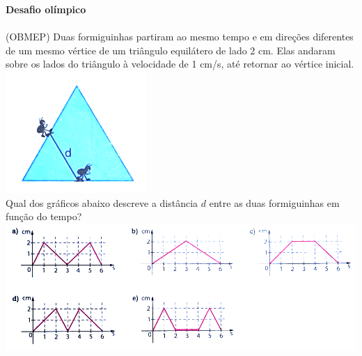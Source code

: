 \documentclass[a4paper,14pt]{article}
\begin{document}
    	    \noindent\textbf{Desafio olímpico}\\\\
    	    (OBMEP) Duas formiguinhas partiram ao mesmo tempo e em direções diferentes de um mesmo vértice de um triângulo equilátero de lado 2 cm. Elas andaram sobre os lados do triângulo à velocidade de 1 cm/s, até retornar ao vértice inicial. \\
    	    \includegraphics[width=0.3\linewidth]{imagens_8FMA74/imagem2}\\
    	    Qual dos gráficos abaixo descreve a distância $d$ entre as duas formiguinhas em função do tempo? \\
    	    \includegraphics[width=1\linewidth]{imagens_8FMA74/imagem3}
    	    \newpage
\end{document}
